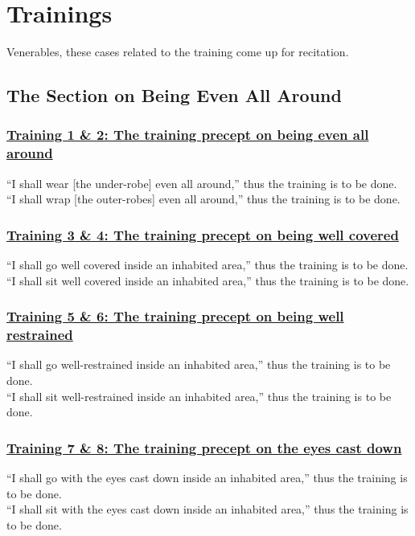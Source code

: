 \section{Trainings}
\label{trainings}

\begin{intro}
  Venerables, these cases related to the training come up for recitation.
\end{intro}

\setsubsecheadstyle{\subsectionFmt}
\subsection{The Section on Being Even All Around}
\vspace{0.2cm}

\subsubsection*{\hyperref[sekh1-2]{Training 1 \& 2: The training precept on being even all around}}
\label{training1-2}
``I shall wear [the under-robe] even all around,'' thus the training is to be done.\\
``I shall wrap [the outer-robes] even all around,'' thus the training is to be done.

\subsubsection*{\hyperref[sekh3-4]{Training 3 \& 4: The training precept on being well covered}}
\label{training3-4}
``I shall go well covered inside an inhabited area,'' thus the training is to be done.\\
``I shall sit well covered inside an inhabited area,'' thus the training is to be done.

\subsubsection*{\hyperref[sekh5-6]{Training 5 \& 6: The training precept on being well restrained}}
\label{training5-6}
``I shall go well-restrained inside an inhabited area,'' thus the training is to be done.\\
``I shall sit well-restrained inside an inhabited area,'' thus the training is to be done.

\subsubsection*{\hyperref[sekh7-8]{Training 7 \& 8: The training precept on the eyes cast down}}
\label{training7-8}
``I shall go with the eyes cast down inside an inhabited area,'' thus the training is to be done.\\
``I shall sit with the eyes cast down inside an inhabited area,'' thus the training is to be done.

